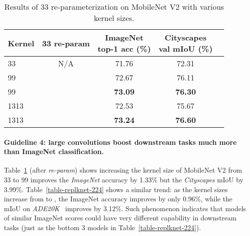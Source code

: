 \documentclass[10pt,twocolumn,letterpaper]{article}
\begin{document}
	\begin{table}
		\caption{Results of 33 re-parameterization on MobileNet V2 with various kernel sizes.}
		\label{table-mob2-reparam}
		\vspace{-0.2in}
		\begin{center}
			\small
			\begin{tabular}{lcccc}
				\hline
				Kernel 					&	33 re-param		& \makecell{ImageNet \\ top-1 acc (\%)}	&	\makecell{Cityscapes \\ val mIoU (\%)}	\\
				\hline
				33				&  N/A						&	71.76				&	72.31	\\
\hline
				99			&						&	72.67				&	76.11	\\
				99			&	\checkmark			&	\textbf{73.09}				&	\textbf{76.30}	\\
				\hline
				1313		&						&	72.53				&	75.67	\\
				1313		&	\checkmark			&	\textbf{73.24}				&	\textbf{76.60}	\\			
				\hline
			\end{tabular}
		\end{center}
		\vspace{-0.25in}
	\end{table}
	
	
	
	\vspace{-0.15in}\paragraph{Guideline 4: large convolutions boost downstream tasks much more
than ImageNet classification.} 
Table~\ref{table-mob2-reparam} (after \emph{re-param}) shows increasing the kernel size of MobileNet V2 from 33 to 99 improves the \emph{ImageNet} accuracy by 1.33\% but the \emph{Cityscapes} mIoU by 3.99\%. Table~\ref{table-replknet-224} shows a similar trend: as the kernel sizes increase from  to , the ImageNet accuracy improves by only 0.96\%, while the mIoU on \emph{ADE20K}~\cite{zhou2019semantic} improves by 3.12\%. Such phenomenon indicates that models of similar ImageNet scores could have very different capability in downstream tasks (just as the bottom 3 models in Table~\ref{table-replknet-224}).  
\end{document}
